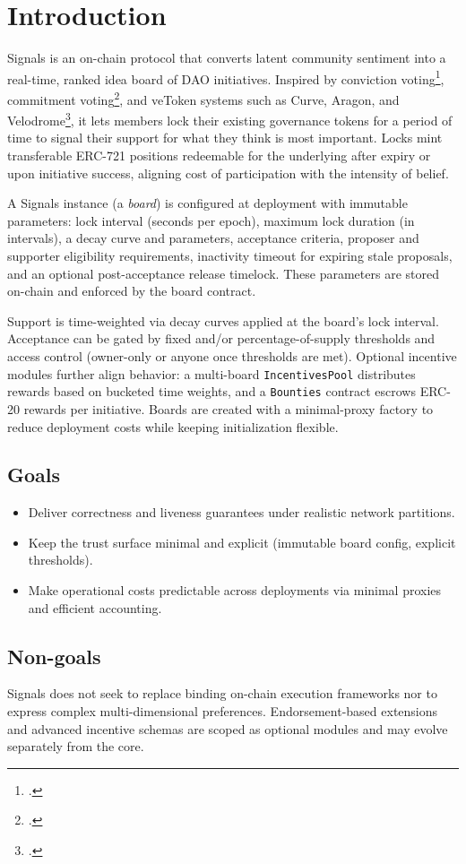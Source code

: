 \section{Introduction}
Signals is an on-chain protocol that converts latent community sentiment into a real-time, ranked idea board of DAO initiatives. Inspired by conviction voting\footnote{\cite{convictionvoting-cadcad, emmett2019conviction}.}, commitment voting\footnote{\cite{berg2020commitment, khezr2024bond}.}, and veToken systems such as Curve, Aragon, and Velodrome\footnote{\cite{curve-vecrv-understanding, curve-vecrv-overview, aragon2024mode, velodrome2022launch}.}, it lets members lock their existing governance tokens for a period of time to signal their support for what they think is most important. Locks mint transferable ERC-721 positions redeemable for the underlying after expiry or upon initiative success, aligning cost of participation with the intensity of belief.

A Signals instance (a \emph{board}) is configured at deployment with immutable parameters: lock interval (seconds per epoch), maximum lock duration (in intervals), a decay curve and parameters, acceptance criteria, proposer and supporter eligibility requirements, inactivity timeout for expiring stale proposals, and an optional post-acceptance release timelock. These parameters are stored on-chain and enforced by the board contract.

Support is time-weighted via decay curves applied at the board's lock interval. Acceptance can be gated by fixed and/or percentage-of-supply thresholds and access control (owner-only or anyone once thresholds are met). Optional incentive modules further align behavior: a multi-board \texttt{IncentivesPool} distributes rewards based on bucketed time weights, and a \texttt{Bounties} contract escrows ERC-20 rewards per initiative. Boards are created with a minimal-proxy factory to reduce deployment costs while keeping initialization flexible.

\subsection{Goals}
\begin{itemize}[leftmargin=*]
  \item Deliver correctness and liveness guarantees under realistic network partitions.
  \item Keep the trust surface minimal and explicit (immutable board config, explicit thresholds).
  \item Make operational costs predictable across deployments via minimal proxies and efficient accounting.
\end{itemize}

\subsection{Non-goals}
Signals does not seek to replace binding on-chain execution frameworks nor to express complex multi-dimensional preferences. Endorsement-based extensions and advanced incentive schemas are scoped as optional modules and may evolve separately from the core.
